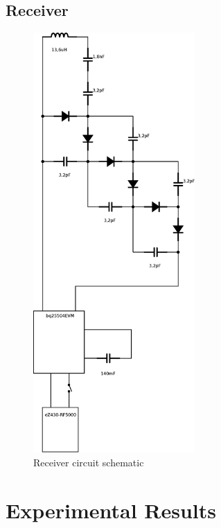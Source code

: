 \section{Receiver}
\begin{figure}[H]
\begin{center}
\includegraphics[width=0.55\textwidth]{./images/ReceiverSchematic}
\caption{Receiver circuit schematic}
\end{center}
\end{figure}









\chapter{Experimental Results} \label{Appendix: experimental}

